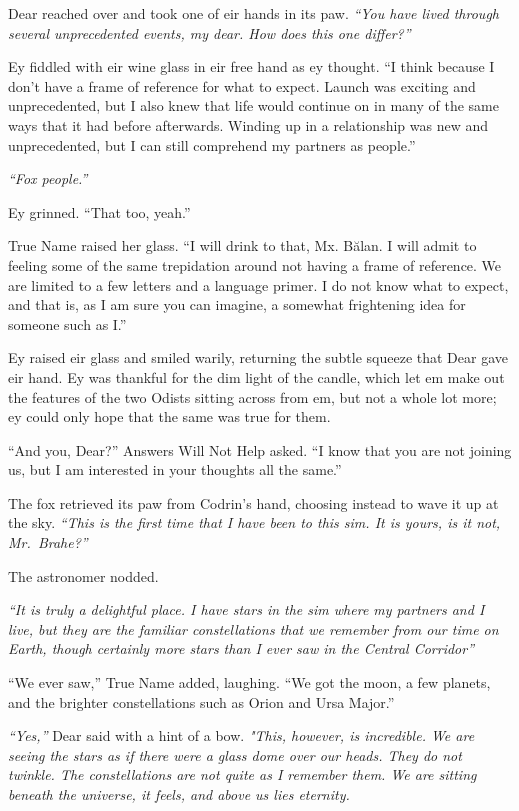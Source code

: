 Dear reached over and took one of eir hands in its paw. \emph{``You have lived through several unprecedented events, my dear. How does this one differ?''}

Ey fiddled with eir wine glass in eir free hand as ey thought. ``I think because I don't have a frame of reference for what to expect. Launch was exciting and unprecedented, but I also knew that life would continue on in many of the same ways that it had before afterwards. Winding up in a relationship was new and unprecedented, but I can still comprehend my partners as people.''

\emph{``Fox people.''}

Ey grinned. ``That too, yeah.''

True Name raised her glass. ``I will drink to that, Mx. Bălan. I will admit to feeling some of the same trepidation around not having a frame of reference. We are limited to a few letters and a language primer. I do not know what to expect, and that is, as I am sure you can imagine, a somewhat frightening idea for someone such as I.''

Ey raised eir glass and smiled warily, returning the subtle squeeze that Dear gave eir hand. Ey was thankful for the dim light of the candle, which let em make out the features of the two Odists sitting across from em, but not a whole lot more; ey could only hope that the same was true for them.

``And you, Dear?'' Answers Will Not Help asked. ``I know that you are not joining us, but I am interested in your thoughts all the same.''

The fox retrieved its paw from Codrin's hand, choosing instead to wave it up at the sky. \emph{``This is the first time that I have been to this sim. It is yours, is it not, Mr.~Brahe?''}

The astronomer nodded.

\emph{``It is truly a delightful place. I have stars in the sim where my partners and I live, but they are the familiar constellations that we remember from our time on Earth, though certainly more stars than I ever saw in the Central Corridor''}

``We ever saw,'' True Name added, laughing. ``We got the moon, a few planets, and the brighter constellations such as Orion and Ursa Major.''

\emph{``Yes,''} Dear said with a hint of a bow. \emph{"This, however, is incredible. We are seeing the stars as if there were a glass dome over our heads. They do not twinkle. The constellations are not quite as I remember them. We are sitting beneath the universe, it feels, and above us lies eternity.}

